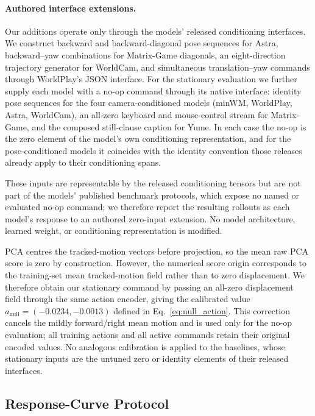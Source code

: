 \documentclass[letterpaper]{article} %
\begin{document}
\paragraph{Authored interface extensions.}
Our additions operate only through the models' released conditioning
interfaces. We construct backward and backward-diagonal pose sequences for
Astra, backward--yaw combinations for Matrix-Game diagonals, an
eight-direction trajectory generator for WorldCam, and simultaneous
translation--yaw commands through WorldPlay's JSON interface. For the
stationary evaluation we further supply each model with a no-op command
through its native interface: identity pose sequences for the four
camera-conditioned models (minWM, WorldPlay, Astra, WorldCam), an all-zero
keyboard and mouse-control stream for Matrix-Game, and the composed
still-clause caption for Yume. In each case the no-op is the zero element of
the model's own conditioning representation, and for the pose-conditioned
models it coincides with the identity convention those releases already apply
to their conditioning spans.

These inputs are representable by the released conditioning tensors but are
not part of the models' published benchmark protocols, which expose no named
or evaluated no-op command; we therefore report the resulting rollouts as each
model's response to an authored zero-input extension. No model architecture,
learned weight, or conditioning representation is modified.

PCA centres the tracked-motion vectors before projection, so the mean raw PCA
score is zero by construction. However, the numerical score origin corresponds
to the training-set mean tracked-motion field rather than to zero displacement.
We therefore obtain our stationary command by passing an all-zero displacement
field through the same action encoder, giving the calibrated value
$a_{\mathrm{null}}=(-0.0234,-0.0013)$ defined in
Eq.~\eqref{eq:null_action}. This correction cancels the mildly forward/right
mean motion and is used only for the no-op evaluation; all training actions and
all active commands retain their original encoded values. No analogous
calibration is applied to the baselines, whose stationary inputs are the
untuned zero or identity elements of their released interfaces.

\subsection{Response-Curve Protocol}
\label{app:response_details}
\end{document}
